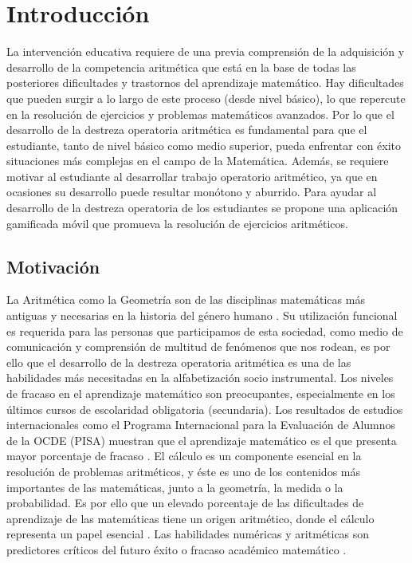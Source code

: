 \documentclass{article}
\begin{document}
\section{Introducción}
La intervención educativa requiere de una previa comprensión de la adquisición y desarrollo de la competencia aritmética
que está en la base de todas las posteriores dificultades y trastornos del aprendizaje matemático. Hay dificultades que
pueden surgir a lo largo de este proceso (desde nivel básico), lo que repercute en la resolución de ejercicios y problemas matemáticos avanzados.
Por lo que el desarrollo de la destreza operatoria aritmética es fundamental para que el estudiante, tanto de nivel básico como medio superior, pueda enfrentar con
éxito situaciones más complejas en el campo de la Matemática. Además, se requiere motivar al estudiante al desarrollar
trabajo operatorio aritmético, ya que en ocasiones su desarrollo puede resultar monótono y aburrido. Para ayudar al desarrollo de la destreza operatoria de los estudiantes se propone una aplicación gamificada móvil que promueva la
resolución de ejercicios aritméticos.

\subsection{Motivación}
La Aritmética como la Geometría son de las disciplinas matemáticas más antiguas y necesarias en la historia del género humano \cite{coronado2014estudio}. 
Su utilización funcional es requerida para las personas que participamos de esta sociedad, como medio de comunicación y comprensión de multitud de fenómenos que nos rodean, es por ello que el desarrollo de la destreza operatoria aritmética es una de las habilidades más necesitadas en la alfabetización socio instrumental.
Los niveles de fracaso en el aprendizaje matemático son preocupantes, especialmente en los últimos cursos de escolaridad obligatoria (secundaria). Los resultados de estudios internacionales como el Programa Internacional para la Evaluación de Alumnos de la OCDE (PISA)  \cite{oecd2014what,oecd2016low} muestran que el aprendizaje matemático es el que presenta mayor porcentaje de fracaso \cite{coronado2016academic, mullis2016timss}. El cálculo es un componente esencial en la resolución de problemas aritméticos, y éste es uno de los contenidos más importantes de las matemáticas, junto a la geometría, la medida o la probabilidad. 
Es por ello que un elevado porcentaje de las dificultades de aprendizaje de las matemáticas tiene un origen aritmético, donde el cálculo representa un papel esencial \cite{orrantia2006dificultades}. Las habilidades numéricas y aritméticas son predictores críticos del futuro éxito o fracaso académico matemático \cite{rodriguez2017marcadores}. 
\end{document}
